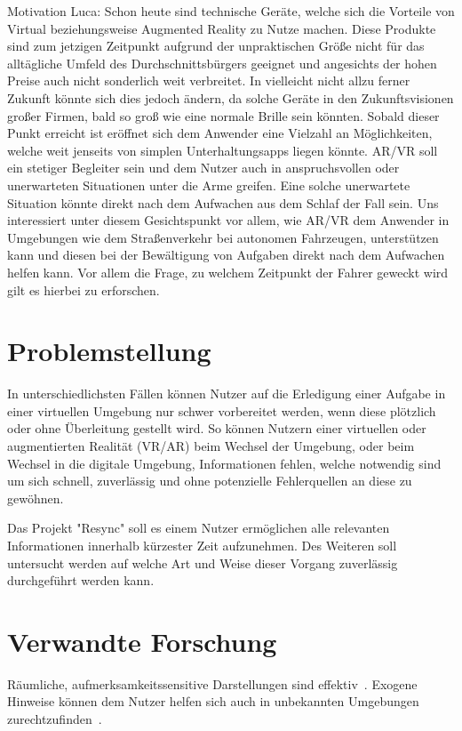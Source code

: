 \documentclass[a4paper, 11pt]{article}
\newcommand{\projectName}{Resync}
\begin{document}
Motivation Luca:
Schon heute sind technische Geräte, welche sich die Vorteile von Virtual beziehungsweise Augmented Reality zu Nutze machen. Diese Produkte sind zum jetzigen Zeitpunkt aufgrund der unpraktischen Größe nicht für das alltägliche Umfeld des Durchschnittsbürgers geeignet und angesichts der hohen Preise auch nicht sonderlich weit verbreitet.
In vielleicht nicht allzu ferner Zukunft könnte sich dies jedoch ändern, da solche Geräte in den Zukunftsvisionen großer Firmen, bald so groß wie eine normale Brille sein könnten.
Sobald dieser Punkt erreicht ist eröffnet sich dem Anwender eine Vielzahl an Möglichkeiten, welche weit jenseits von simplen Unterhaltungsapps liegen könnte. 
AR/VR soll ein stetiger Begleiter sein und dem Nutzer auch in anspruchsvollen oder unerwarteten Situationen unter die Arme greifen. Eine solche unerwartete Situation könnte direkt nach dem Aufwachen aus dem Schlaf der Fall sein. Uns interessiert unter diesem Gesichtspunkt vor allem, wie AR/VR dem Anwender in Umgebungen wie dem Straßenverkehr bei autonomen Fahrzeugen, unterstützen kann und diesen bei der Bewältigung von Aufgaben direkt nach dem Aufwachen helfen kann. Vor allem die Frage, zu welchem Zeitpunkt der Fahrer geweckt wird gilt es hierbei zu erforschen.


\section*{Problemstellung}
In unterschiedlichsten Fällen können Nutzer auf die Erledigung einer Aufgabe in einer virtuellen Umgebung nur schwer vorbereitet werden, wenn diese  plötzlich oder ohne Überleitung gestellt wird. So können Nutzern einer virtuellen oder augmentierten Realität (VR/AR) beim Wechsel der Umgebung, oder beim Wechsel in die digitale Umgebung, Informationen fehlen, welche notwendig sind um sich schnell, zuverlässig und ohne potenzielle Fehlerquellen an diese zu gewöhnen. 

Das Projekt "\projectName" soll es einem Nutzer ermöglichen alle relevanten Informationen innerhalb kürzester Zeit aufzunehmen. Des Weiteren soll untersucht werden auf welche Art und Weise dieser Vorgang zuverlässig durchgeführt werden kann.

\section*{Verwandte Forschung}
Räumliche, aufmerksamkeitssensitive Darstellungen sind effektiv~\cite{bonanni2005attention}. Exogene Hinweise können dem Nutzer helfen sich auch in unbekannten Umgebungen zurechtzufinden~\cite{bonanni2005attention}.
\end{document}
